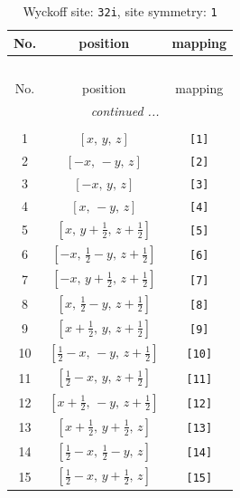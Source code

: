 \documentclass[fleqn,8pt]{jsarticle}
\begin{document}
\renewcommand{\arraystretch}{1.2}
\begin{longtable}{ccc}
\caption{Wyckoff site: {\tt 32i}, site symmetry: {\tt 1}}
 \\
 \hline \hline
No. & position & mapping \\ \hline \endfirsthead

\multicolumn{2}{l}{\tablename\ \thetable{}} \\
 \hline \hline
No. & position & mapping \\ \hline \endhead

 \hline \hline
\multicolumn{2}{r}{\footnotesize\it continued ...} \\ \endfoot

 \hline \hline
\multicolumn{2}{r}{} \\ \endlastfoot

1 & $\left[ x,\, y,\, z \right]$ & {\tt [1]} \\ \hline
2 & $\left[ - x,\, - y,\, z \right]$ & {\tt [2]} \\ \hline
3 & $\left[ - x,\, y,\, z \right]$ & {\tt [3]} \\ \hline
4 & $\left[ x,\, - y,\, z \right]$ & {\tt [4]} \\ \hline
5 & $\left[ x,\, y + \frac{1}{2},\, z + \frac{1}{2} \right]$ & {\tt [5]} \\ \hline
6 & $\left[ - x,\, \frac{1}{2} - y,\, z + \frac{1}{2} \right]$ & {\tt [6]} \\ \hline
7 & $\left[ - x,\, y + \frac{1}{2},\, z + \frac{1}{2} \right]$ & {\tt [7]} \\ \hline
8 & $\left[ x,\, \frac{1}{2} - y,\, z + \frac{1}{2} \right]$ & {\tt [8]} \\ \hline
9 & $\left[ x + \frac{1}{2},\, y,\, z + \frac{1}{2} \right]$ & {\tt [9]} \\ \hline
10 & $\left[ \frac{1}{2} - x,\, - y,\, z + \frac{1}{2} \right]$ & {\tt [10]} \\ \hline
11 & $\left[ \frac{1}{2} - x,\, y,\, z + \frac{1}{2} \right]$ & {\tt [11]} \\ \hline
12 & $\left[ x + \frac{1}{2},\, - y,\, z + \frac{1}{2} \right]$ & {\tt [12]} \\ \hline
13 & $\left[ x + \frac{1}{2},\, y + \frac{1}{2},\, z \right]$ & {\tt [13]} \\ \hline
14 & $\left[ \frac{1}{2} - x,\, \frac{1}{2} - y,\, z \right]$ & {\tt [14]} \\ \hline
15 & $\left[ \frac{1}{2} - x,\, y + \frac{1}{2},\, z \right]$ & {\tt [15]} \\ \hline

\end{longtable}
\end{document}
